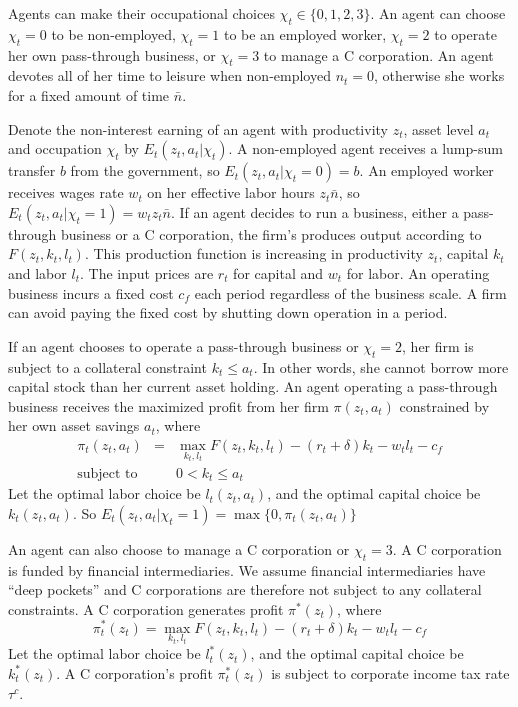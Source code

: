 \documentclass[12pt]{article}
\begin{document}
Agents can make their occupational choices $\chi_t\in\{0,1,2,3\}$. An agent can choose $\chi_t=0$ to be non-employed, $\chi_t=1$ to be an employed worker, $\chi_t=2$ to operate her own pass-through business, or $\chi_t=3$ to manage a C corporation. An agent devotes all of her time to leisure when non-employed $n_t=0$, otherwise she works for a fixed amount of time $\bar{n}$. 

Denote the non-interest earning of an agent with productivity $z_t$, asset level $a_t$ and occupation $\chi_t$ by $E_t(z_t,a_t|\chi_t)$. A non-employed agent receives a lump-sum transfer $b$ from the government, so $E_t(z_t,a_t|\chi_t=0)=b$. An employed worker receives wages rate $w_t$ on her effective labor hours $z_t\bar{n}$, so $E_t(z_t,a_t|\chi_t=1)=w_tz_t\bar{n}$. If an agent decides to run a business, either a pass-through business or a C corporation, the firm's produces output according to $F(z_t,k_t,l_t)$. This production function is increasing in productivity $z_t$, capital $k_t$ and labor $l_t$. The input prices are $r_t$ for capital and $w_t$ for labor. An operating business incurs a fixed cost $c_f$ each period regardless of the business scale. A firm can avoid paying the fixed cost by shutting down operation in a period.

If an agent chooses to operate a pass-through business or $\chi_t=2$, her
firm is subject to a collateral constraint $k_t\leq a_t$. In other words,
she cannot borrow more capital stock than her current asset holding. An
agent operating a pass-through business receives the maximized profit from
her firm $\pi(z_t,a_t)$ constrained by her own asset savings $a_t$, where 
\begin{eqnarray*}
\pi_t(z_t,a_t)&=&\max_{k_t,l_t}F(z_t,k_t,l_t)-(r_t+\delta)k_t-w_tl_t-c_f\\
\text{subject to } && 0<k_t\leq a_t
\end{eqnarray*}
Let the optimal labor choice be $l_t(z_t,a_t)$, and the optimal capital choice
be $k_t(z_t,a_t)$. So $E_t(z_t,a_t|\chi_t=1)=\max\{0,\pi_t(z_t,a_t)\}$

An agent can also choose to manage a C corporation or $\chi_t=3$. A
C corporation is funded by financial intermediaries. We assume financial
intermediaries have ``deep pockets'' and C corporations are therefore not
subject to any collateral constraints. A C corporation generates profit $\pi^*(z_t)$, where 
\begin{equation*}
\pi_t^*(z_t)=\max_{k_t,l_t}F(z_t,k_t,l_t)-(r_t+\delta)k_t-w_tl_t-c_f
\end{equation*}
Let the optimal labor choice be $l_t^*(z_t)$, and the optimal capital choice
be $k_t^*(z_t)$. A C corporation's profit $\pi_t^*(z_t)$ is subject to corporate income tax rate $\tau^c$.
\end{document}
